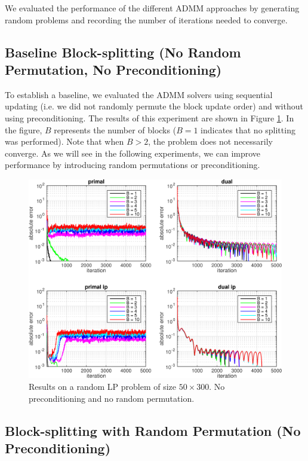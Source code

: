 \documentclass{article}
\begin{document}
We evaluated the performance of the different ADMM approaches by generating random problems and recording the number of iterations needed to converge.

\newpage
\subsection*{Baseline Block-splitting (No Random Permutation, No Preconditioning)}
To establish a baseline, we evaluated the ADMM solvers using sequential updating (i.e. we did not randomly permute the block update order) and without using preconditioning. The results of this experiment are shown in Figure \ref{fig:nop_nor}. In the figure, $B$ represents the number of blocks ($B=1$ indicates that no splitting was performed). Note that when $B>2$, the problem does not necessarily converge. As we will see in the following experiments, we can improve performance by introducing random permutations or preconditioning.

\begin{figure}[h]
	\includegraphics[width=\textwidth]{../figures/noprecond_norndperm.png}
	\caption{Results on a random LP problem of size $50 \times 300$. No preconditioning and no random permutation.}
	\label{fig:nop_nor}
\end{figure}

\subsection*{Block-splitting with Random Permutation (No Preconditioning)}
\end{document}
